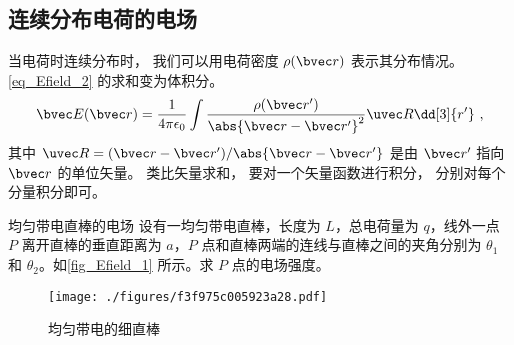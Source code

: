 \subsection{连续分布电荷的电场}
当电荷时连续分布时， 我们可以用电荷密度 $\rho(\bvec r)$ 表示其分布情况。 \autoref{eq_Efield_2} 的求和变为体积分。
\begin{equation}\label{eq_Efield_9}
\bvec E(\bvec r) = \frac{1}{4\pi\epsilon_0} \int \frac{\rho(\bvec r')}{\abs{\bvec r - \bvec r'}^2} \uvec R \dd[3]{r'}~,
\end{equation}
其中 $\uvec R = (\bvec r - \bvec r') / \abs{\bvec r - \bvec r'}$ 是由 $\bvec r'$ 指向 $\bvec r$ 的单位矢量。 类比矢量求和， 要对一个矢量函数进行积分， 分别对每个分量积分即可。

\begin{example}{均匀带电直棒的电场}\label{ex_Efield_1}
设有一均匀带电直棒，长度为 $L$，总电荷量为 $q$，线外一点 $P$ 离开直棒的垂直距离为 $a$，$P$ 点和直棒两端的连线与直棒之间的夹角分别为 $\theta_1$ 和 $\theta_2$。如\autoref{fig_Efield_1} 所示。求 $P$ 点的电场强度。
\begin{figure}[ht]
\centering
\texttt{[image: ./figures/f3f975c005923a28.pdf]}
\caption{均匀带电的细直棒} \label{fig_Efield_1}
\end{figure}


\end{example}
